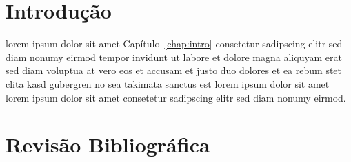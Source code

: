 

\frenchspacing

\chapter{\label{chap:intro}Introdução}
%
%
%

lorem ipsum dolor sit amet Capítulo~\ref{chap:intro} consetetur
sadipscing elitr sed diam nonumy eirmod tempor invidunt ut labore
et dolore magna aliquyam erat sed diam voluptua at vero eos et
accusam et justo duo dolores et ea rebum stet clita kasd gubergren
no sea takimata sanctus est lorem ipsum dolor sit amet lorem ipsum
dolor sit amet consetetur sadipscing elitr sed diam nonumy eirmod.~\cite{COFFMANPACKING98}




\chapter{\label{chap:revbiblio}Revisão Bibliográfica}


